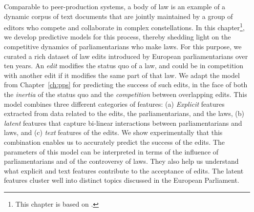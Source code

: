 
Comparable to peer-production systems, a body of law is an example of a dynamic corpus of text documents that are jointly maintained by a group of editors who compete and collaborate in complex constellations.
In this chapter\footnote{This chapter is based on \citet{kristof2020war, kristof2021war}.}, we develop predictive models for this process, thereby shedding light on the competitive dynamics of parliamentarians who make laws.
For this purpose, we curated a rich dataset of  law edits introduced by European parliamentarians over ten years.
An \textit{edit} modifies the status quo of a law, and could be in competition with another edit if it modifies the same part of that law.
We adapt the \interank{} model from Chapter~\ref{ch:pps} for predicting the success of such edits, in the face of both the \textit{inertia} of the status quo and the \textit{competition} between overlapping edits.
This model combines three different categories of features:
(a) \emph{Explicit} features extracted from data related to the edits, the parliamentarians, and the laws, (b) \emph{latent} features that capture bi-linear interactions between parliamentarians and laws, and (c) \emph{text} features of the edits.
We show experimentally that this combination enables us to accurately predict the success of the edits.
The parameters of this model can be interpreted in terms of the influence of parliamentarians and of the controversy of laws.
They also help us understand what explicit and text features contribute to the acceptance of edits.
The latent features cluster well into distinct topics discussed in the European Parliament.
